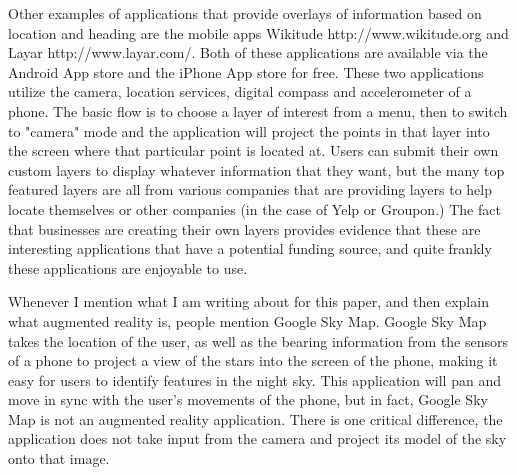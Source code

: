 \documentclass{acm_proc_article-sp}
\begin{document}
Other examples of applications that provide overlays of information based on location and heading are the mobile apps Wikitude http://www.wikitude.org and Layar http://www.layar.com/.  Both of these applications are available via the Android App store and the iPhone App store for free.  These two applications utilize the camera, location services, digital compass and accelerometer of a phone.  The basic flow is to choose a layer of interest from a menu, then to switch to "camera" mode and the application will project the points in that layer into the screen where that particular point is located at.  Users can submit their own custom layers to display whatever information that they want, but the many top featured layers are all from various companies that are providing layers to help locate themselves or other companies (in the case of Yelp or Groupon.)  The fact that businesses are creating their own layers provides evidence that these are interesting applications that have a potential funding source, and quite frankly these applications are enjoyable to use.

Whenever I mention what I am writing about for this paper, and then explain what augmented reality is, people mention Google Sky Map.  Google Sky Map takes the location of the user, as well as the bearing information from the sensors of a phone to project a view of the stars into the screen of the phone, making it easy for users to identify features in the night sky. This application will pan and move in sync with the user's movements of the phone, but in fact, Google Sky Map is not an augmented reality application.  There is one critical difference, the application does not take input from the camera and project its model of the sky onto that image. \cite{Ouilhet:2010:GSM:1851600.1851695}
\end{document}
